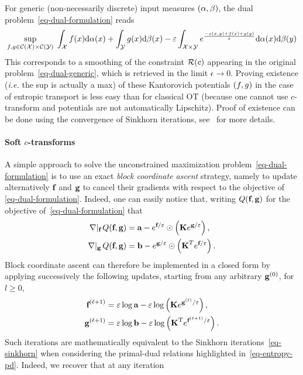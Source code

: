 

For generic (non-necessarily discrete) input measures $(\alpha,\beta)$, the dual problem~\eqref{eq-dual-formulation} reads
\begin{align*}
	\underset{f,g \in \mathcal{C}(\mathcal{X})\times\mathcal{C}(\mathcal{Y})}{\sup}\; \int_{\mathcal{X}} f(x)\mathrm{d}\alpha(x) + \int_{\mathcal{Y}} g(x)\mathrm{d}\beta(x) 
		 - \varepsilon \int_{\mathcal{X}\times\mathcal{Y}} e^{ \frac{-c(x,y)+f(x)+g(y)}{\varepsilon} } \mathrm{d}\alpha(x)\mathrm{d}\beta(y)
\end{align*}
This corresponds to a smoothing of the constraint $\mathcal{R}(c)$ appearing in the original problem~\eqref{eq-dual-generic}, which is retrieved in the limit $\epsilon \rightarrow 0$.
%
Proving existence (\emph{i.e.} the sup is actually a max) of these Kantorovich potentials $(f,g)$ in the case of entropic transport is less easy than for classical OT (because one cannot use $c$-transform and potentials are not automatically Lipschitz). Proof of existence can be done using the convergence of Sinkhorn iterations, see~\cite{2016-chizat-sinkhorn} for more details.


  
\paragraph{Soft $c$-transforms}


A simple approach to solve the unconstrained maximization problem~\eqref{eq-dual-formulation} is to use an exact \emph{block coordinate ascent} strategy, namely to update alternatively $\mathrm{\textbf{\upshape f}}$ and $\mathrm{\textbf{\upshape g}}$ to cancel their gradients with respect to the objective of \eqref{eq-dual-formulation}. Indeed, one can easily notice that, writing $Q(\mathrm{\textbf{\upshape f}},\mathrm{\textbf{\upshape g}})$ for the objective of~\eqref{eq-dual-formulation} that 
\begin{align}
	\label{eq-dualupadate-sinkh-1}\nabla|_{\mathrm{\textbf{\upshape f}}}\, Q(\mathrm{\textbf{\upshape f}},\mathrm{\textbf{\upshape g}}) &=  \mathrm{\textbf{\upshape a}} - e^{\mathrm{\textbf{\upshape f}}/\varepsilon}\odot \left(\mathrm{\textbf{\upshape K}} e^{\mathrm{\textbf{\upshape g}}/\varepsilon}\right),\\
	\label{eq-dualupadate-sinkh-2}\nabla|_{\mathrm{\textbf{\upshape g}}}\, Q(\mathrm{\textbf{\upshape f}},\mathrm{\textbf{\upshape g}}) &=  \mathrm{\textbf{\upshape b}} - e^{\mathrm{\textbf{\upshape g}}/\varepsilon}\odot \left(\mathrm{\textbf{\upshape K}}^T e^{\mathrm{\textbf{\upshape f}}/\varepsilon}\right).
\end{align}
Block coordinate ascent can therefore be implemented in a closed form by applying successively the following updates, starting from any arbitrary $\mathrm{\textbf{\upshape g}}^{(0)}$, for $l\geq 0$,
\begin{align}
	\label{eq-slse-sinkh-1}\mathrm{\textbf{\upshape f}}^{(\ell+1)} &= \varepsilon \log \mathrm{\textbf{\upshape a}} -\varepsilon\log\left(\mathrm{\textbf{\upshape K}} e^{\mathrm{\textbf{\upshape g}}^{(\ell)}/\varepsilon}\right), \\
	\label{eq-slse-sinkh-2}\mathrm{\textbf{\upshape g}}^{(\ell+1)} &= \varepsilon \log \mathrm{\textbf{\upshape b}}- \varepsilon\log\left({\mathrm{\textbf{\upshape K}}}^{\mathrm{T}} e^{\mathrm{\textbf{\upshape f}}^{(\ell+1)}/\varepsilon}\right).
\end{align}
Such iterations are mathematically equivalent to the Sinkhorn iterations~\eqref{eq-sinkhorn} when considering the primal-dual relations highlighted in~\eqref{eq-entropy-pd}. Indeed, we recover that at any iteration


